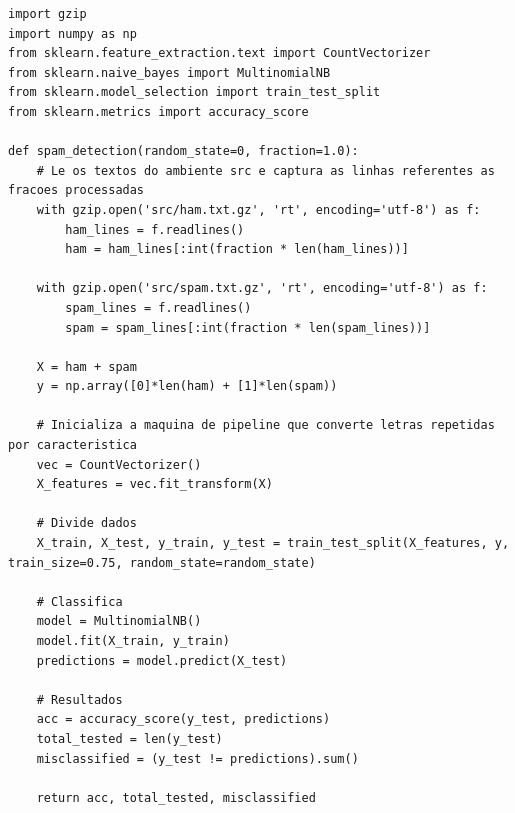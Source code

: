 \documentclass[11pt,a4paper]{article}
\begin{document}
\begin{solucao}
\begin{lstlisting}
import gzip
import numpy as np
from sklearn.feature_extraction.text import CountVectorizer
from sklearn.naive_bayes import MultinomialNB
from sklearn.model_selection import train_test_split
from sklearn.metrics import accuracy_score

def spam_detection(random_state=0, fraction=1.0):
    # Le os textos do ambiente src e captura as linhas referentes as fracoes processadas
    with gzip.open('src/ham.txt.gz', 'rt', encoding='utf-8') as f:
        ham_lines = f.readlines()
        ham = ham_lines[:int(fraction * len(ham_lines))]
        
    with gzip.open('src/spam.txt.gz', 'rt', encoding='utf-8') as f:
        spam_lines = f.readlines()
        spam = spam_lines[:int(fraction * len(spam_lines))]
        
    X = ham + spam
    y = np.array([0]*len(ham) + [1]*len(spam))
    
    # Inicializa a maquina de pipeline que converte letras repetidas por caracteristica
    vec = CountVectorizer()
    X_features = vec.fit_transform(X)
    
    # Divide dados
    X_train, X_test, y_train, y_test = train_test_split(X_features, y, train_size=0.75, random_state=random_state)
    
    # Classifica
    model = MultinomialNB()
    model.fit(X_train, y_train)
    predictions = model.predict(X_test)
    
    # Resultados
    acc = accuracy_score(y_test, predictions)
    total_tested = len(y_test)
    misclassified = (y_test != predictions).sum()
    
    return acc, total_tested, misclassified
\end{lstlisting}
\end{solucao}
\end{document}
